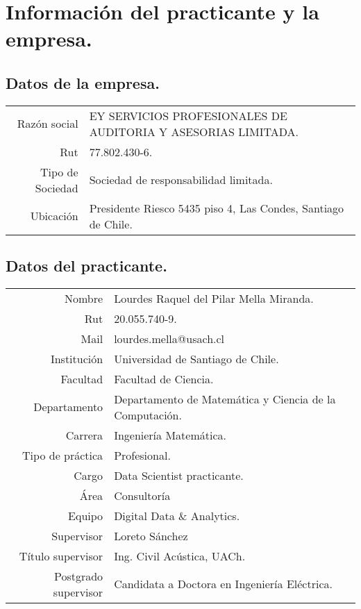 \documentclass{article}
\begin{document}

\tableofcontents
\newpage

\section{Información del practicante y la empresa.}
\subsection{Datos de la empresa.}

\begin{tabular}{r l}
    Razón social & EY SERVICIOS PROFESIONALES DE AUDITORIA Y ASESORIAS LIMITADA.\\
    Rut & 77.802.430-6.\\
	Tipo de Sociedad & Sociedad de responsabilidad limitada.\\
	Ubicación & Presidente Riesco 5435 piso 4, Las Condes, Santiago de Chile.\\

\end{tabular}

\subsection{Datos del practicante.}

\begin{tabular}{r l}
	Nombre & Lourdes Raquel del Pilar Mella Miranda.\\ 
	Rut & 20.055.740-9.\\
	Mail & lourdes.mella@usach.cl\\
	Institución & Universidad de Santiago de Chile.\\
	Facultad & Facultad de Ciencia.\\
	Departamento & Departamento de Matemática y Ciencia de la Computación.\\
	Carrera & Ingeniería Matemática.\\
	Tipo de práctica & Profesional.\\
	Cargo & Data Scientist practicante.\\
	Área & Consultoría\\
	Equipo & Digital Data \& Analytics.\\
	Supervisor & Loreto Sánchez\\
	Título supervisor & Ing. Civil Acústica, UACh.\\
	Postgrado supervisor & Candidata a Doctora en Ingeniería Eléctrica.

\end{tabular}
\end{document}
